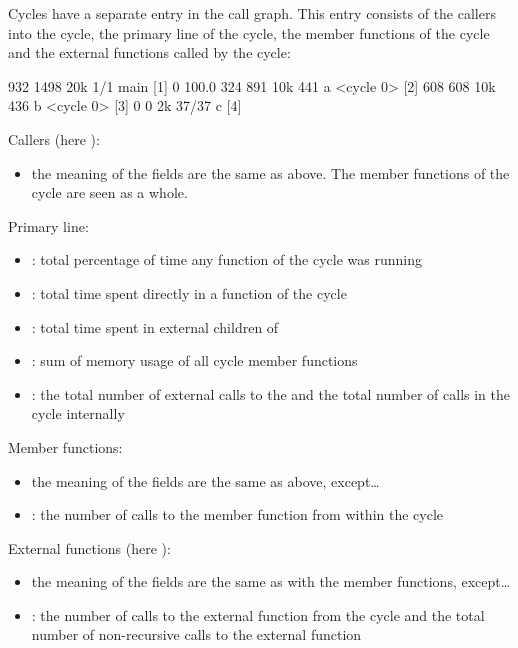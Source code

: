 Cycles have a separate entry in the call graph.
This entry consists of the callers into the cycle, the primary line of the cycle,
the member functions of the cycle and the external functions called by the cycle:

\begin{example}
            932   1498  20k      1/1      main [1]
 0  100.0%
            324    891  10k      441      a <cycle 0> [2]
            608    608  10k      436      b <cycle 0> [3]
              0      0   2k    37/37      c [4]
\end{example}

Callers (here ):
\begin{itemize}
	\item the meaning of the fields are the same
	as above. The member functions of the cycle are seen as a whole.
\end{itemize}

Primary line:
\begin{itemize}
	\item {}:
		total percentage of time any function of the cycle was running
	\item {}:
		total time spent directly in a function of the cycle
	\item {}:
		total time spent in external children of 
	\item {}:
		sum of memory usage of all cycle member functions
	\item {}:
		the total number of external calls to the  and the total number
		of calls in the cycle internally
\end{itemize}

Member functions:
\begin{itemize}
	\item the meaning of the fields are the same as above, except\ldots
	\item {}: the number of calls to the member function from within the cycle
\end{itemize}

External functions (here ):
\begin{itemize}
	\item the meaning of the fields are the same as with the member functions, except\ldots
	\item {}: the number of calls to the external function from the cycle
		and
		the total number of non-recursive calls to the external function
\end{itemize}


